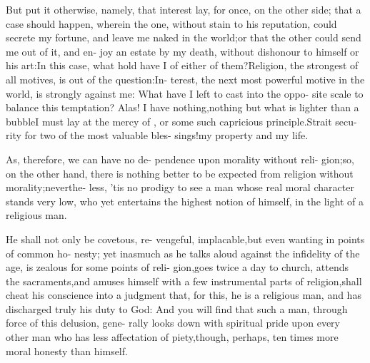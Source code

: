 \documentclass[twoside]{article}
\begin{document}
\lqq But put it otherwise, namely, that\break
\lqq interest lay, for once, on the other side;\break
\lqq that a case should happen, wherein the\break
\lqq one, without stain to his reputation,\break
\lqq could secrete my fortune, and leave
\lqq me naked in the world;\tsk or that the\break
\lqq other could send me out of it, and en-\break
\lqq joy an estate by my death, without\break
\lqq dishonour to himself or his art:\tsk In\break
\lqq this case, what hold have I of either of\break
\lqq them?\tsk Religion, the strongest of all\break
\lqq motives, is out of the question:\tsk In-\break
\lqq terest, the next most powerful motive\break
\lqq in the world, is strongly against me:\tsk\break
\lqq What have I left to cast into the oppo-\break
\lqq site scale to balance this temptation?\tsk\break
\lqq Alas! I have nothing,\tsk nothing but\break
\lqq what is lighter than a bubble\tsk I must\break
\lqq lay at the mercy of , or some\break
\lqq such capricious principle.\tsk Strait secu-\break
\lqq rity for two of the most valuable bles-\break
\lqq sings!\tsk my property and my life.

\lqq As, therefore, we can have no de-\break
\lqq pendence upon morality without reli-\break
\lqq gion;\tsk so, on the other hand, there is
\lqq nothing better to be expected from\break
\lqq religion without morality;\tsk neverthe-\break
\lqq less, ’tis no prodigy to see a man whose\break
\lqq real moral character stands very low,\break
\lqq who yet entertains the highest notion\break
\lqq of himself, in the light of a religious\break
\lqq man.

\lqq He shall not only be covetous, re-\break
\lqq vengeful, implacable,\tsk but even\break
\lqq wanting in points of common ho-\break
\lqq nesty; yet inasmuch as he talks aloud\break
\lqq against the infidelity of the age,\tsh\break
\lqq is zealous for some points of reli-\break
\lqq gion,\tsh goes twice a day to church,\break
\lqq \tsh attends the sacraments,\tsh and\break
\lqq amuses himself with a few instrumental\break
\lqq parts of religion,\tsk shall cheat his\break
\lqq conscience into a judgment that, for\break
\lqq this, he is a religious man, and has\break
\lqq discharged truly his duty to God:
\lqq And you will find that such a man,\break
\lqq through force of this delusion, gene-\break
\lqq rally looks down with spiritual pride\break
\lqq upon every other man who has less\break
\lqq affectation of piety,\tsk though, perhaps,\break
\lqq ten times more moral honesty than\break
\lqq himself.
\end{document}
